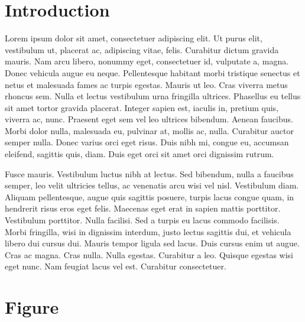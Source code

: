 \section{Introduction}

Lorem ipsum dolor sit amet, consectetuer adipiscing elit. Ut purus elit, vestibulum ut, placerat ac, adipiscing vitae, felis. Curabitur dictum gravida mauris. Nam arcu libero, nonummy eget, consectetuer id, vulputate a, magna. Donec vehicula augue eu neque. Pellentesque habitant
morbi tristique senectus et netus et malesuada fames ac turpis egestas. Mauris ut leo. Cras
viverra metus rhoncus sem. Nulla et lectus vestibulum urna fringilla ultrices. Phasellus eu tellus sit amet tortor gravida placerat. Integer sapien est, iaculis in, pretium quis, viverra ac, nunc. Praesent eget sem vel leo ultrices bibendum. Aenean faucibus. Morbi dolor nulla, malesuada eu, pulvinar at, mollis ac, nulla. Curabitur auctor semper nulla. Donec varius orci eget risus. Duis nibh mi, congue eu, accumsan eleifend, sagittis quis, diam. Duis eget orci sit amet orci dignissim rutrum.

\begin{table}[ht]
\centering
\caption{A table}
\end{table}

Fusce mauris. Vestibulum luctus nibh at lectus. Sed bibendum, nulla a faucibus semper, leo
velit ultricies tellus, ac venenatis arcu wisi vel nisl. Vestibulum diam. Aliquam pellentesque,
augue quis sagittis posuere, turpis lacus congue quam, in hendrerit risus eros eget felis. Maecenas
eget erat in sapien mattis porttitor. Vestibulum porttitor. Nulla facilisi. Sed a turpis eu lacus
commodo facilisis. Morbi fringilla, wisi in dignissim interdum, justo lectus sagittis dui, et
vehicula libero dui cursus dui. Mauris tempor ligula sed lacus. Duis cursus enim ut augue. Cras
ac magna. Cras nulla. Nulla egestas. Curabitur a leo. Quisque egestas wisi eget nunc. Nam
feugiat lacus vel est. Curabitur consectetuer.

\section{Figure}

